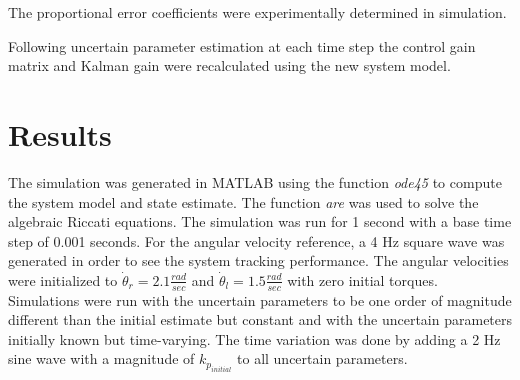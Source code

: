 \documentclass[letterpaper,12pt]{report}
\begin{document}
The proportional error coefficients were experimentally determined in simulation.

Following uncertain parameter estimation at each time step the control gain matrix and Kalman gain were recalculated using the new system model.

\chapter{Results}

The simulation was generated in MATLAB using the function {\it ode45} to compute the system model and state estimate. The function {\it are} was used to solve the algebraic Riccati equations.
The simulation was run for 1 second with a base time step of 0.001 seconds. For the angular velocity reference, a 4 Hz square wave was generated in order to see the system tracking performance.
The angular velocities were initialized to $\dot\theta_r = 2.1 \frac{rad}{sec}$ and $\dot\theta_l = 1.5 \frac{rad}{sec}$ with zero initial torques. Simulations were run with the uncertain parameters
to be one order of magnitude different than the initial estimate but constant and with the uncertain parameters initially known but time-varying. The time variation was done by adding a 2 Hz sine wave
with a magnitude of $k_{p_{initial}}$ to all uncertain parameters.
\end{document}
